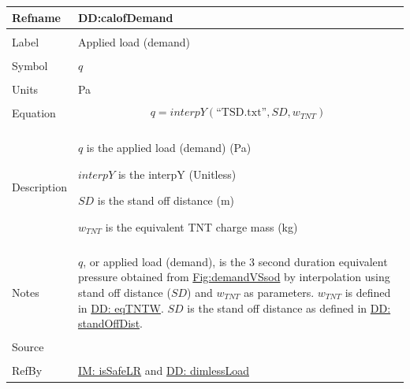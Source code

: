 \documentclass[12pt]{article}
\begin{document}
\vspace{\baselineskip}
\noindent
\begin{minipage}{\textwidth}
\begin{tabular}{>{\raggedright}p{}>{\raggedright\arraybackslash}p{}}
\toprule \textbf{Refname} & \textbf{DD:calofDemand}
\label{DD:calofDemand}
\\ \midrule \\
Label & Applied load (demand)
        
\\ \midrule \\
Symbol & $q$
         
\\ \midrule \\
Units & Pa
        
\\ \midrule \\
Equation & \begin{displaymath}
           q=interpY\left(\text{``TSD.txt''},SD,{w_{TNT}}\right)
           \end{displaymath}
\\ \midrule \\
Description & \begin{symbDescription}
              \item{$q$ is the applied load (demand) (Pa)}
              \item{$interpY$ is the interpY (Unitless)}
              \item{$SD$ is the stand off distance (m)}
              \item{${w_{TNT}}$ is the equivalent TNT charge mass (kg)}
              \end{symbDescription}
\\ \midrule \\
Notes & $q$, or applied load (demand), is the 3 second duration equivalent pressure obtained from \hyperref[Figure:demandVSsod]{Fig:demandVSsod} by interpolation using stand off distance ($SD$) and ${w_{TNT}}$ as parameters. ${w_{TNT}}$ is defined in \hyperref[DD:eqTNTW]{DD: eqTNTW}. $SD$ is the stand off distance as defined in \hyperref[DD:standOffDist]{DD: standOffDist}.
        
\\ \midrule \\
Source & \cite{astm2009}
         
\\ \midrule \\
RefBy & \hyperref[IM:isSafeLR]{IM: isSafeLR} and \hyperref[DD:dimlessLoad]{DD: dimlessLoad}
        
\\ \bottomrule
\end{tabular}
\end{minipage}
\end{document}
